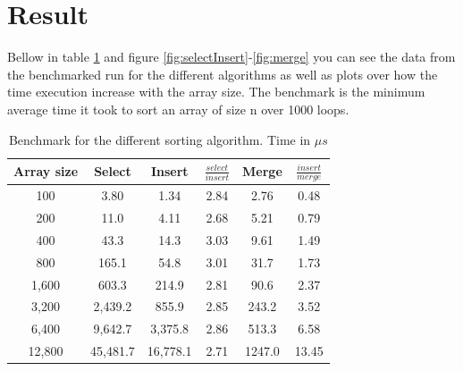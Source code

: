 \documentclass[a4paper,11pt]{article}
\begin{document}
\section*{Result}
Bellow in table \ref{tab:benchmark} and figure \ref{fig:selectInsert}-\ref{fig:merge} you can see the data from the benchmarked run for the different algorithms
 as well as plots over how the time execution increase with the array size. The benchmark is the minimum average time it took to sort an array of size n over 1000 loops.
\begin{table}[h!]
    \begin{center}
        \begin{tabular}{|c|c|c|c|c|c|}
            \hline
            \textbf{Array size} & \textbf{Select} & \textbf{Insert} & \textbf{$\frac{select}{insert}$} & \textbf{Merge} & \textbf{$\frac{insert}{merge}$} \\
            \hline
            100                 & 3.80            & 1.34            & 2.84                             & 2.76           & 0.48                            \\
            200                 & 11.0            & 4.11            & 2.68                             & 5.21           & 0.79                            \\
            400                 & 43.3            & 14.3            & 3.03                             & 9.61           & 1.49                            \\
            800                 & 165.1           & 54.8            & 3.01                             & 31.7           & 1.73                            \\
            1,600               & 603.3           & 214.9           & 2.81                             & 90.6           & 2.37                            \\
            3,200               & 2,439.2         & 855.9           & 2.85                             & 243.2          & 3.52                            \\
            6,400               & 9,642.7         & 3,375.8         & 2.86                             & 513.3          & 6.58                            \\
            12,800              & 45,481.7        & 16,778.1        & 2.71                             & 1247.0         & 13.45                           \\
            \hline
        \end{tabular}
        \caption{Benchmark for the different sorting algorithm. Time in $\mu s$}
        \label{tab:benchmark}
    \end{center}
\end{table}
\end{document}
